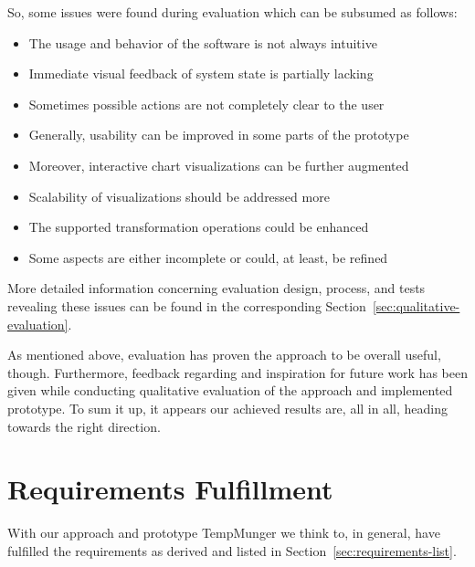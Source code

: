 So, some issues were found during evaluation which can be subsumed as follows:

\begin{itemize}
  \item The usage and behavior of the software is not always intuitive
  \item Immediate visual feedback of system state is partially lacking
  \item Sometimes possible actions are not completely clear to the user
  \item Generally, usability can be improved in some parts of the prototype
  \item Moreover, interactive chart visualizations can be further augmented
  \item Scalability of visualizations should be addressed more
  \item The supported transformation operations could be enhanced
  \item Some aspects are either incomplete or could, at least, be refined
\end{itemize}

More detailed information concerning evaluation design, process, and tests revealing these issues can be found in the corresponding Section~\ref{sec:qualitative-evaluation}.

As mentioned above, evaluation has proven the approach to be overall useful, though.
Furthermore, feedback regarding and inspiration for future work has been given while conducting qualitative evaluation of the approach and implemented prototype.
To sum it up, it appears our achieved results are, all in all, heading towards the right direction.


\section{Requirements Fulfillment}

With our approach and prototype TempMunger we think to, in general, have fulfilled the requirements as derived and listed in Section~\ref{sec:requirements-list}.


